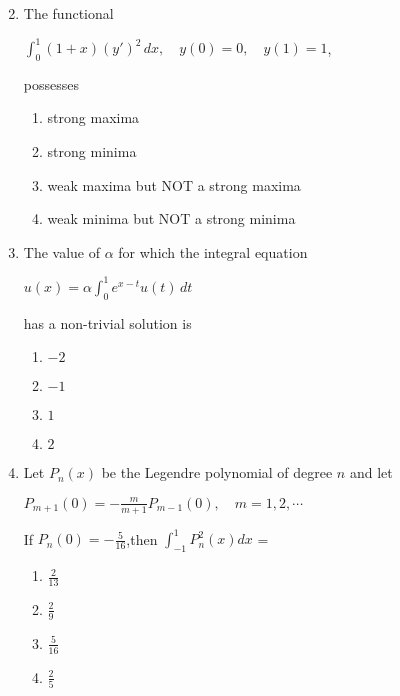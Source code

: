 \documentclass[journal]{IEEEtran}
\theoremstyle{remark}
\begin{document}
\begin{enumerate}
\begin{multicols}{2}
                \end{multicols}

                \item The functional 
                \begin{center}
                    $\int_{0}^{1} (1+x)(y')^2 \, dx, \quad y(0) = 0, \quad y(1) = 1$,
                \end{center}
                possesses
                \begin{enumerate}
                    \item strong maxima 
                    \item strong minima 
                    \item weak maxima but NOT a strong maxima 
                    \item weak minima but NOT a strong minima 
                \end{enumerate}

                \item The value of $\alpha$ for which the integral equation 
                \begin{center}
                    $u(x) = \alpha \int_{0}^{1} e^{x-t} u(t) \, dt$
                \end{center}
                has a non-trivial solution is 
                \begin{multicols}{4}
                \begin{enumerate}
                    \item $-2$
                    \item $-1$
                    \item $1$
                    \item $2$
                \end{enumerate}
                    
                \end{multicols}

                \item Let $P_n(x)$ be the Legendre polynomial of degree $n$ and let 
                \begin{center}
                     $P_{m+1}(0)=-\frac{m}{m+1}P_{m-1}(0), \quad m=1,2,\cdots$
                \end{center}
                If $P_n(0)=-\frac{5}{16}$,then \quad $\int_{-1}^{1}P_n^2(x)dx$ =
                \begin{multicols}{4}
                \begin{enumerate}
                    \item $\frac{2}{13}$
                    \item $\frac{2}{9}$
                    \item $\frac{5}{16}$
                    \item $\frac{2}{5}$
                \end{enumerate}
                    
                \end{multicols}
            
            \end{enumerate}
\end{document}
